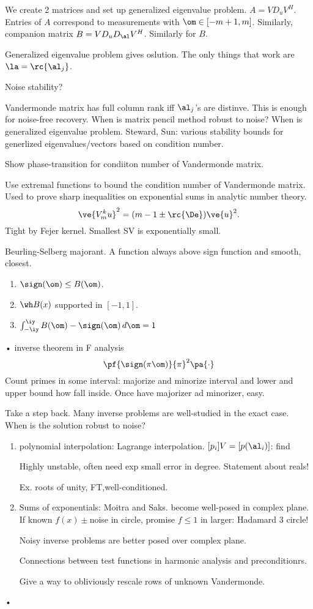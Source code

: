 We create 2 matrices and set up generalized eigenvalue problem. $A=VD_u V^H$. Entries of $A$ correspond to measurements with $\om\in [-m+1,m]$. Similarly, companion matrix $B=VD_uD_\al V^H$. Similarly for $B$. 

Generalized eigenvalue problem gives oslution. The only things that work are $\la=\rc{\al_j}$.

Noise stability?

Vandermonde matrix has full column rank iff $\al_j$'s are distinve. This is enough for noise-free recovery. When is matrix pencil method robust to noise? When is generalized eigenvalue problem. Steward, Sun: various stability bounds for generlized eigenvalues/vectors based on condition number.

Show phase-transition for condiiton number of Vandermonde matrix.

Use extremal functions to bound the condition number of Vandermonde matrix. Used to prove sharp inequalities on exponential sums in analytic number theory.
\[
\ve{V_m^ku}^2 = (m-1\pm \rc{\De}) \ve{u}^2.
\]
Tight by Fejer kernel. Smallest SV is exponentially small.

Beurling-Selberg majorant. A function always above sign function and smooth, closest.
\begin{enumerate}
\item
$\sign(\om)\le B(\om)$.
\item
$\wh B(x)$ supported in $[-1,1]$.
\item
$\int_{-\iy}^{\iy} B(\om)-\sign(\om)\,d\om = 1$
\end{enumerate}•
inverse theorem in F analysis
\[
\pf{\sign(\pi \om)}{\pi}^2\pa{\cdot}
\]
Count primes in some interval: majorize and minorize interval and lower and upper bound how fall inside. Once have majorizer ad minorizer, easy.

Take a step back. 
Many inverse problems are well-studied in the exact case.
When is the solution robust to noise?
\begin{enumerate}
\item
polynomial interpolation: Lagrange interpolation. 
$[p_i]V=[p(\al_i)]$: find 

Highly unstable, often need exp small error in degree.
Statement about reals!

Ex. roots of unity, FT,well-conditioned.
\item
Sums of exponentials: Moitra and Saks. become well-posed in complex plane. If known $f(x)\pm$noise in circle, promise $f\le 1$ in larger: Hadamard 3 circle!

Noisy inverse problems are better posed over complex plane.

Connections between test functions in harmonic analysis and preconditionrs.

Give a way to obliviously rescale rows of unknown Vandermonde.
\end{enumerate}•